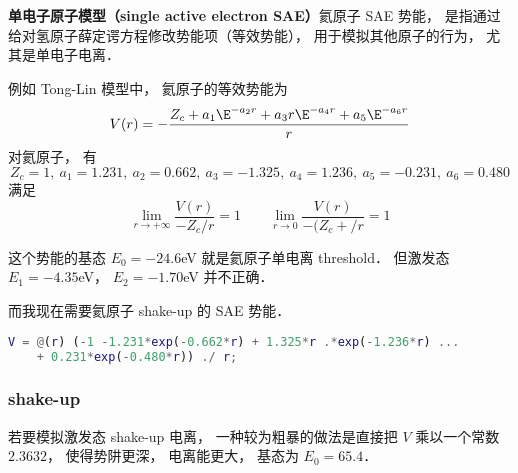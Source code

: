 
\textbf{单电子原子模型（single active electron SAE）}氦原子 SAE 势能， 是指通过给对氢原子薛定谔方程修改势能项（等效势能）， 用于模拟其他原子的行为， 尤其是单电子电离．

例如 Tong-Lin 模型中， 氦原子的等效势能为
\begin{equation}
V(r) = -\frac{Z_c + a_1 \E^{-a_2 r} + a_3 r \E^{-a_4 r} + a_5 \E^{-a_6 r}}{r}
\end{equation}
对氦原子， 有
\begin{equation}
Z_c = 1, \ a_1 = 1.231,\ a_2 = 0.662,\ a_3 = -1.325,\ a_4 = 1.236,\ a_5 = -0.231,\ a_6 = 0.480
\end{equation}
满足
\begin{equation}
\lim_{r\to +\infty} \frac{V(r)}{-Z_c/r} = 1
\qquad
\lim_{r\to 0} \frac{V(r)}{-(Z_c + /r} = 1
\end{equation}

这个势能的基态 $E_0 = -24.6$eV 就是氦原子单电离 threshold． 但激发态 $E_1 = -4.35$eV， $E_2 = -1.70$eV 并不正确．

而我现在需要氦原子 shake-up 的 SAE 势能．

\begin{lstlisting}[language=matlab]
V = @(r) (-1 -1.231*exp(-0.662*r) + 1.325*r .*exp(-1.236*r) ...
    + 0.231*exp(-0.480*r)) ./ r;
\end{lstlisting}

\subsubsection{shake-up}
若要模拟激发态 shake-up 电离， 一种较为粗暴的做法是直接把 $V$ 乘以一个常数 $2.3632$， 使得势阱更深， 电离能更大， 基态为 $E_0 = 65.4$．
